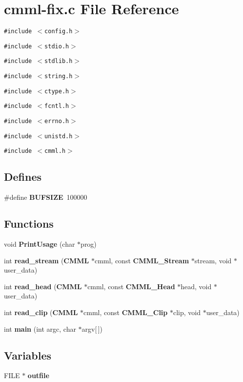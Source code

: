 \section{cmml-fix.c File Reference}
\label{cmml-fix_8c}
{\tt \#include $<$config.h$>$}\par
{\tt \#include $<$stdio.h$>$}\par
{\tt \#include $<$stdlib.h$>$}\par
{\tt \#include $<$string.h$>$}\par
{\tt \#include $<$ctype.h$>$}\par
{\tt \#include $<$fcntl.h$>$}\par
{\tt \#include $<$errno.h$>$}\par
{\tt \#include $<$unistd.h$>$}\par
{\tt \#include $<$cmml.h$>$}\par
\subsection*{Defines}
\begin{CompactItemize}
\item 
\#define {\bf BUFSIZE}\ 100000
\end{CompactItemize}
\subsection*{Functions}
\begin{CompactItemize}
\item 
void {\bf Print\-Usage} (char $\ast$prog)
\item 
int {\bf read\_\-stream} ({\bf CMML} $\ast$cmml, const {\bf CMML\_\-Stream} $\ast$stream, void $\ast$user\_\-data)
\item 
int {\bf read\_\-head} ({\bf CMML} $\ast$cmml, const {\bf CMML\_\-Head} $\ast$head, void $\ast$user\_\-data)
\item 
int {\bf read\_\-clip} ({\bf CMML} $\ast$cmml, const {\bf CMML\_\-Clip} $\ast$clip, void $\ast$user\_\-data)
\item 
int {\bf main} (int argc, char $\ast$argv[$\,$])
\end{CompactItemize}
\subsection*{Variables}
\begin{CompactItemize}
\item 
FILE $\ast$ {\bf outfile}
\end{CompactItemize}



